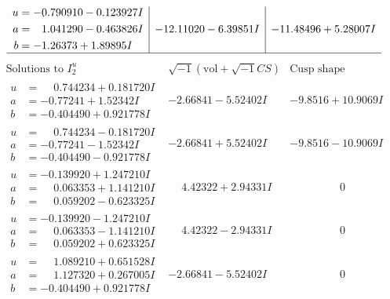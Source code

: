 \documentclass[1p]{elsarticle_modified}
\theoremstyle{definition}
\newcommand{\I}{\sqrt{-1}}
\begin{document}
$$\begin{array}{c|c|c}
\begin{aligned}
u &= -0.790910 - 0.123927 I \\
a &= \phantom{-}1.041290 - 0.463826 I \\
b &= -1.26373 + 1.89895 I\end{aligned}
 & -12.11020 - 6.39851 I & -11.48496 + 5.28007 I\\
 \hline 
 \end{array}$$\newpage$$\begin{array}{c|c|c}  
\text{Solutions to }I^u_{2}& \I (\text{vol} + \sqrt{-1}CS) & \text{Cusp shape}\\
 \hline 
\begin{aligned}
u &= \phantom{-}0.744234 + 0.181720 I \\
a &= -0.77241 + 1.52342 I \\
b &= -0.404490 + 0.921778 I\end{aligned}
 & -2.66841 - 5.52402 I & -9.8516 + 10.9069 I \\ \hline\begin{aligned}
u &= \phantom{-}0.744234 - 0.181720 I \\
a &= -0.77241 - 1.52342 I \\
b &= -0.404490 - 0.921778 I\end{aligned}
 & -2.66841 + 5.52402 I & -9.8516 - 10.9069 I \\ \hline\begin{aligned}
u &= -0.139920 + 1.247210 I \\
a &= \phantom{-}0.063353 + 1.141210 I \\
b &= \phantom{-}0.059202 - 0.623325 I\end{aligned}
 & \phantom{-}4.42322 + 2.94331 I & \phantom{-0.000000 } 0 \\ \hline\begin{aligned}
u &= -0.139920 - 1.247210 I \\
a &= \phantom{-}0.063353 - 1.141210 I \\
b &= \phantom{-}0.059202 + 0.623325 I\end{aligned}
 & \phantom{-}4.42322 - 2.94331 I & \phantom{-0.000000 } 0 \\ \hline\begin{aligned}
u &= \phantom{-}1.089210 + 0.651528 I \\
a &= \phantom{-}1.127320 + 0.267005 I \\
b &= -0.404490 + 0.921778 I\end{aligned}
 & -2.66841 - 5.52402 I & \phantom{-0.000000 } 0 \\ \hline\begin{aligned}

\end{aligned}
\end{array}$$
\end{document}
